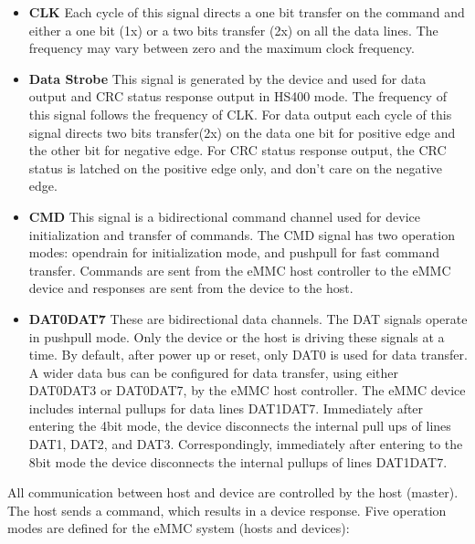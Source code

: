 \begin{itemize}
  \item \textbf{CLK} Each cycle of this signal directs a one bit transfer on the command and either a one bit (1x) or a two bits transfer (2x) on all the data lines. The frequency may vary between zero and the maximum clock frequency.

  \item \textbf{Data Strobe} This signal is generated by the device and used for data output and CRC status response output in HS400 mode. The frequency of this signal follows the frequency of CLK. For data output each cycle of this signal directs two bits transfer(2x) on the data one bit for positive edge and the other bit for negative edge. For CRC status response output, the CRC status is latched on the positive edge only, and don't care on the negative edge.

  \item \textbf{CMD} This signal is a bidirectional command channel used for device initialization and transfer of commands. The CMD signal has two operation modes: opendrain for initialization mode, and push\textendash pull for fast command transfer. Commands are sent from the eMMC host controller to the eMMC device and responses are sent from the device to the host.

  \item \textbf{DAT0\textendash DAT7} These are bidirectional data channels. The DAT signals operate in push\textendash pull mode. Only the device or the host is driving these signals at a time. By default, after power up or reset, only DAT0 is used for data transfer. A wider data bus can be configured for data transfer, using either DAT0\textendash DAT3 or DAT0\textendash DAT7, by the eMMC host controller. The eMMC device includes internal pull\textendash ups for data lines DAT1\textendash DAT7. Immediately after entering the 4\textendash bit mode, the device disconnects the internal pull ups of lines DAT1, DAT2, and DAT3. Correspondingly, immediately after entering to the 8\textendash bit mode the device disconnects the internal pull\textendash ups of lines DAT1\textendash DAT7.
\end{itemize}

All communication between host and device are controlled by the host (master). The host sends a command, which results in a device response. Five operation modes are defined for the eMMC system (hosts and devices):

